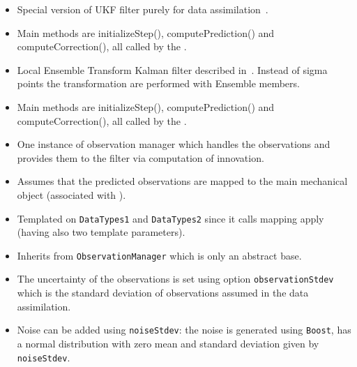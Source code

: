 \documentclass[10pt]{article}
\begin{document}
\medskip
{\large \ukfsc}
\begin{itemize}
\item Special version of UKF filter purely for data assimilation~\cite{EbrahimianExtendedKalmanFilterForMaterialParameterEstimationInNonlinearStructuralFiniteElementModels2015}.
\item Main methods are initializeStep(), computePrediction() and computeCorrection(), all called by the \al.
\end{itemize}
\medskip
{\large {}}
\begin{itemize}
\item Local Ensemble Transform Kalman filter described in~\cite{HuttDivergenceOfTheEnsembleTransformKalmanFilter2020}. Instead of sigma points the transformation are performed with Ensemble members.
\item Main methods are initializeStep(), computePrediction() and computeCorrection(), all called by the \al.
\end{itemize}
\medskip
{\large\mobs}
\begin{itemize}
\item One instance of observation manager which handles the observations and provides them to the filter via computation of innovation.
\item Assumes that the predicted observations are mapped to the main mechanical object (associated with \ssw).
\item Templated on \texttt{DataTypes1} and \texttt{DataTypes2} since it calls mapping apply (having also two template parameters).
\item Inherits from \texttt{ObservationManager} which is only an abstract base.
\item The uncertainty of the observations is set using option \texttt{observationStdev} which is the standard deviation of observations assumed in the data assimilation.
\item Noise can be added using \texttt{noiseStdev}: the noise is generated using \texttt{Boost}, has a normal distribution with zero mean and standard deviation given by \texttt{noiseStdev}.
\end{itemize}
\medskip
{\large\opr}
\end{document}
